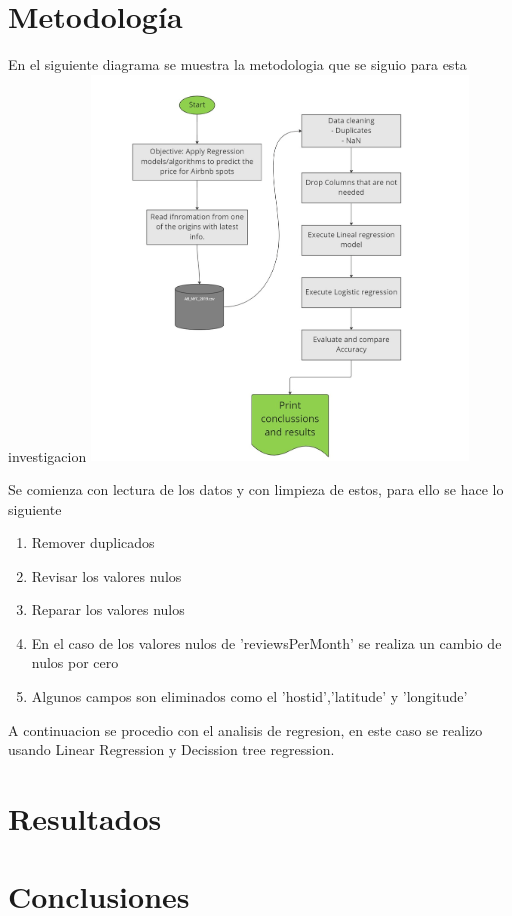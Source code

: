 \documentclass[conference]{IEEEtran}
\begin{document}
\section{Metodología}
En el siguiente diagrama se muestra la metodologia que se siguio para esta investigacion
\includegraphics[width=10cm]{images/Metodologia.png}

Se comienza con lectura de los datos y con limpieza de estos, para ello se hace lo siguiente 
\begin{enumerate}
    \item Remover duplicados
    \item Revisar los valores nulos
    \item Reparar los valores nulos 
    \item En el caso de los valores nulos de 'reviewsPerMonth' se realiza un cambio de nulos por cero
    \item Algunos campos son eliminados como el 'hostid','latitude' y 'longitude'
\end{enumerate}

A continuacion se procedio con el analisis de regresion, en este caso se realizo usando Linear Regression y Decission tree regression.
\section{Resultados}


\section{Conclusiones}

\cite{Schwarzova_undated-cm,Schwarzova2020-ud,Kalehbasti2020-sk}

\end{document}
